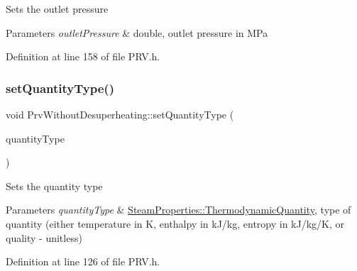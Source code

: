 Sets the outlet pressure


\begin{DoxyParams}{Parameters}
{\em outlet\+Pressure} & double, outlet pressure in M\+Pa \\
\hline
\end{DoxyParams}


Definition at line 158 of file P\+R\+V.\+h.

\mbox{\label{class_prv_without_desuperheating_a212177b7a16c7452358df4120196c04b}} 
\subsubsection{\texorpdfstring{set\+Quantity\+Type()}{setQuantityType()}\hspace{0.1cm}{\footnotesize\ttfamily [1/3]}}
{\footnotesize\ttfamily void Prv\+Without\+Desuperheating\+::set\+Quantity\+Type (\begin{DoxyParamCaption}\item[{\hyperlink{class_steam_properties_ae0294bedf7d178c2d8fb6aed0f62fbff}{Steam\+Properties\+::\+Thermodynamic\+Quantity}}]{quantity\+Type }\end{DoxyParamCaption})\hspace{0.3cm}{\ttfamily [inline]}}

Sets the quantity type


\begin{DoxyParams}{Parameters}
{\em quantity\+Type} & \hyperlink{class_steam_properties_ae0294bedf7d178c2d8fb6aed0f62fbff}{Steam\+Properties\+::\+Thermodynamic\+Quantity}, type of quantity (either temperature in K, enthalpy in k\+J/kg, entropy in k\+J/kg/K, or quality -\/ unitless) \\
\hline
\end{DoxyParams}


Definition at line 126 of file P\+R\+V.\+h.

\mbox{\label{class_prv_without_desuperheating_a212177b7a16c7452358df4120196c04b}} 
